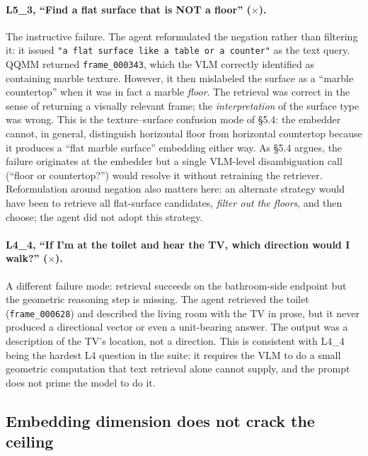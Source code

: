 \documentclass[12pt,letterpaper,oneside]{article}
\begin{document}
\paragraph{L5\_3, ``Find a flat surface that is NOT a floor'' ($\times$).}
The instructive failure.  The agent reformulated the negation rather
than filtering it: it issued
\texttt{"a flat surface like a table or a counter"} as the text query.
QQMM returned \texttt{frame\_000343}, which the VLM correctly
identified as containing marble texture.  However, it then mislabeled
the surface as a ``marble countertop'' when it was in fact a marble
\emph{floor}.  The retrieval was correct in the sense of returning a
visually relevant frame; the \emph{interpretation} of the surface
type was wrong.  This is the texture--surface confusion mode of
\S5.4: the embedder cannot, in general, distinguish horizontal floor
from horizontal countertop because it produces a ``flat marble
surface'' embedding either way.  As \S5.4 argues, the failure
originates at the embedder but a single VLM-level disambiguation
call (``floor or countertop?'') would resolve it without retraining
the retriever.  Reformulation around negation also matters here: an
alternate strategy would have been to retrieve all flat-surface
candidates, \emph{filter out the floors}, and then choose; the
agent did not adopt this strategy.

\paragraph{L4\_4, ``If I'm at the toilet and hear the TV, which direction would I walk?'' ($\times$).}
A different failure mode: retrieval succeeds on the bathroom-side
endpoint but the geometric reasoning step is missing.  The agent
retrieved the toilet (\texttt{frame\_000628}) and described the
living room with the TV in prose, but it never produced a directional
vector or even a unit-bearing answer.
The output was a description of the TV's location, not a direction.
This is consistent with L4\_4 being the hardest L4 question in the
suite: it requires the VLM to do a small geometric computation that
text retrieval alone cannot supply, and the prompt does not prime the
model to do it.

\subsection{Embedding dimension does not crack the ceiling}\label{sec:dim}
\end{document}
